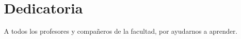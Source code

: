 
\chapter*{Dedicatoria}


A todos los profesores y compañeros de la facultad, por ayudarnos a aprender.